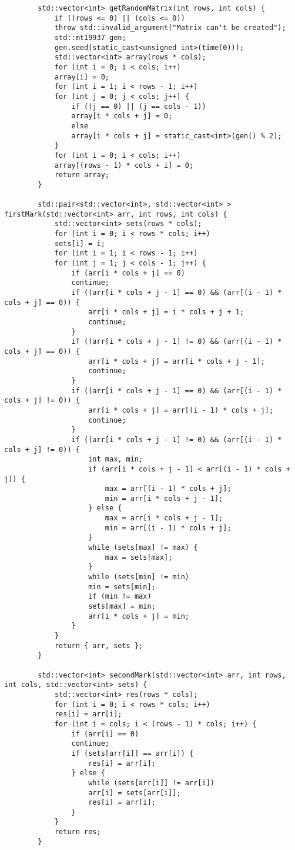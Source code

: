 \documentclass{report}
\begin{document}
\begin{lstlisting}
	    std::vector<int> getRandomMatrix(int rows, int cols) {
	    	if ((rows <= 0) || (cols <= 0))
	    	throw std::invalid_argument("Matrix can't be created");
	    	std::mt19937 gen;
	    	gen.seed(static_cast<unsigned int>(time(0)));
	    	std::vector<int> array(rows * cols);
	    	for (int i = 0; i < cols; i++)
	    	array[i] = 0;
	    	for (int i = 1; i < rows - 1; i++)
	    	for (int j = 0; j < cols; j++) {
	    		if ((j == 0) || (j == cols - 1))
	    		array[i * cols + j] = 0;
	    		else
	    		array[i * cols + j] = static_cast<int>(gen() % 2);
	    	}
	    	for (int i = 0; i < cols; i++)
	    	array[(rows - 1) * cols + i] = 0;
	    	return array;
	    }
	    
	    std::pair<std::vector<int>, std::vector<int> > firstMark(std::vector<int> arr, int rows, int cols) {
	    	std::vector<int> sets(rows * cols);
	    	for (int i = 0; i < rows * cols; i++)
	    	sets[i] = i;
	    	for (int i = 1; i < rows - 1; i++)
	    	for (int j = 1; j < cols - 1; j++) {
	    		if (arr[i * cols + j] == 0)
	    		continue;
	    		if ((arr[i * cols + j - 1] == 0) && (arr[(i - 1) * cols + j] == 0)) {
	    			arr[i * cols + j] = i * cols + j + 1;
	    			continue;
	    		}
	    		if ((arr[i * cols + j - 1] != 0) && (arr[(i - 1) * cols + j] == 0)) {
	    			arr[i * cols + j] = arr[i * cols + j - 1];
	    			continue;
	    		}
	    		if ((arr[i * cols + j - 1] == 0) && (arr[(i - 1) * cols + j] != 0)) {
	    			arr[i * cols + j] = arr[(i - 1) * cols + j];
	    			continue;
	    		}
	    		if ((arr[i * cols + j - 1] != 0) && (arr[(i - 1) * cols + j] != 0)) {
	    			int max, min;
	    			if (arr[i * cols + j - 1] < arr[(i - 1) * cols + j]) {
	    				max = arr[(i - 1) * cols + j];
	    				min = arr[i * cols + j - 1];
	    			} else {
	    				max = arr[i * cols + j - 1];
	    				min = arr[(i - 1) * cols + j];
	    			}
	    			while (sets[max] != max) {
	    				max = sets[max];
	    			}
	    			while (sets[min] != min)
	    			min = sets[min];
	    			if (min != max)
	    			sets[max] = min;
	    			arr[i * cols + j] = min;
	    		}
	    	}
	    	return { arr, sets };
	    }
	    
	    std::vector<int> secondMark(std::vector<int> arr, int rows, int cols, std::vector<int> sets) {
	    	std::vector<int> res(rows * cols);
	    	for (int i = 0; i < rows * cols; i++)
	    	res[i] = arr[i];
	    	for (int i = cols; i < (rows - 1) * cols; i++) {
	    		if (arr[i] == 0)
	    		continue;
	    		if (sets[arr[i]] == arr[i]) {
	    			res[i] = arr[i];
	    		} else {
	    			while (sets[arr[i]] != arr[i])
	    			arr[i] = sets[arr[i]];
	    			res[i] = arr[i];
	    		}
	    	}
	    	return res;
	    }
	    

\end{lstlisting}
\end{document}
